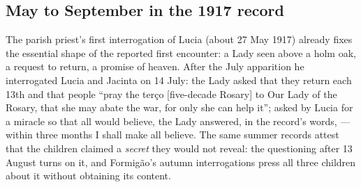 \subsection{May to September in the 1917 record}

The parish priest's first interrogation of Lucia (about 27 May 1917)
already fixes the essential shape of the reported first encounter: a
Lady seen above a holm oak, a request to return, a promise of
heaven. After
the July apparition he interrogated Lucia and Jacinta on 14 July: the
Lady asked that they return each 13th and that people ``pray the
ter\c{c}o [five-decade Rosary] to Our Lady of the Rosary, that she may
abate the war, for only she can help it''; asked by Lucia for a
miracle so that all would believe, the Lady answered, in the record's
words, ---within three months I shall make all
believe. The same summer records attest that the children claimed a
\emph{secret} they would not reveal: the questioning after 13 August
turns on it, and Formig\~ao's autumn interrogations press all three
children about it without obtaining its content.

